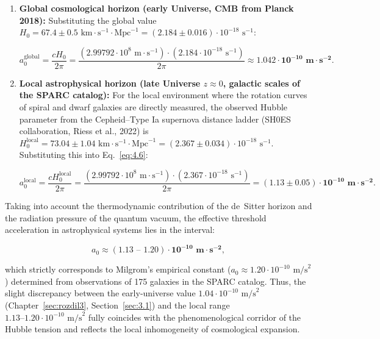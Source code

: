 \begin{enumerate}
\item \textbf{Global cosmological horizon (early Universe, CMB from Planck 2018):}  
Substituting the global value $H_0 = 67.4 \pm 0.5\text{ km}\cdot\text{s}^{-1}\cdot\text{Mpc}^{-1} = (2.184 \pm 0.016) \cdot 10^{-18}\text{ s}^{-1}$:

\begin{equation}\label{eq:4.7}\tag{4.7}
a_0^{\text{global}} = \frac{c H_0}{2\pi} = \frac{(2.99792 \cdot 10^8\text{ m}\cdot\text{s}^{-1}) \cdot (2.184 \cdot 10^{-18}\text{ s}^{-1})}{2\pi} \approx \mathbf{1.042 \cdot 10^{-10}\text{ m}\cdot\text{s}^{-2}}.
\end{equation}

\item \textbf{Local astrophysical horizon (late Universe $z \approx 0$, galactic scales of the SPARC catalog):}  
For the local environment where the rotation curves of spiral and dwarf galaxies are directly measured, the observed Hubble parameter from the Cepheid--Type Ia supernova distance ladder (SH0ES collaboration, Riess et al., 2022) is $H_0^{\text{local}} = 73.04 \pm 1.04\text{ km}\cdot\text{s}^{-1}\cdot\text{Mpc}^{-1} = (2.367 \pm 0.034) \cdot 10^{-18}\text{ s}^{-1}$. Substituting this into Eq.~\eqref{eq:4.6}:

\begin{equation}\label{eq:4.8}\tag{4.8}
a_0^{\text{local}} = \frac{c H_0^{\text{local}}}{2\pi} = \frac{(2.99792 \cdot 10^8\text{ m}\cdot\text{s}^{-1}) \cdot (2.367 \cdot 10^{-18}\text{ s}^{-1})}{2\pi} = \mathbf{(1.13 \pm 0.05) \cdot 10^{-10}\text{ m}\cdot\text{s}^{-2}}.
\end{equation}
\end{enumerate}

Taking into account the thermodynamic contribution of the de~Sitter horizon and the radiation pressure of the quantum vacuum, the effective threshold acceleration in astrophysical systems lies in the interval:

\begin{equation}\label{eq:4.9}\tag{4.9}
a_0 \approx \mathbf{(1.13 \text{ -- } 1.20) \cdot 10^{-10}\text{ m}\cdot\text{s}^{-2}},
\end{equation}

which strictly corresponds to Milgrom's empirical constant ($a_0 \approx 1.20 \cdot 10^{-10}\text{ m/s}^2$) determined from observations of 175 galaxies in the SPARC catalog. Thus, the slight discrepancy between the early-universe value $1.04 \cdot 10^{-10}\text{ m/s}^2$ (Chapter~\ref{sec:rozdil3}, Section~\ref{sec:3.1}) and the local range $1.13\text{--}1.20 \cdot 10^{-10}\text{ m/s}^2$ fully coincides with the phenomenological corridor of the Hubble tension and reflects the local inhomogeneity of cosmological expansion.


